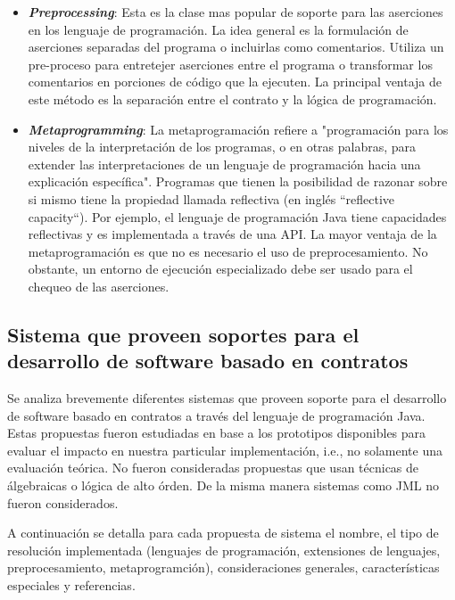{\begin{itemize}
\item \textbf{\textit{Preprocessing}}: Esta es la clase mas popular de soporte para las
aserciones en los lenguaje de programación. La idea general es la formulación
de aserciones separadas del programa o incluirlas como comentarios. Utiliza un
pre-proceso para entretejer aserciones entre el programa o transformar los
comentarios en porciones de código que la ejecuten. La principal ventaja de
este método es la separación entre el contrato y la lógica de programación.


\item \textbf{\textit{Metaprogramming}}: La metaprogramación refiere a 
"programación para los niveles de la interpretación de los
programas, o en otras palabras, para extender las interpretaciones de un
lenguaje de programación hacia una explicación específica"\cite{Temp1}.
Programas que tienen la posibilidad de razonar sobre si mismo tiene la
propiedad llamada reflectiva (en inglés ``reflective capacity``). Por ejemplo,
el lenguaje de programación Java tiene capacidades reflectivas y es
implementada a través de una API. La mayor ventaja de la metaprogramación es
que no es necesario el uso de preprocesamiento. No obstante, un entorno de
ejecución especializado debe ser usado para el chequeo de las aserciones.


\end{itemize}


\subsection{Sistema que proveen soportes para el desarrollo de software
basado en contratos} \label{sec:sistemasca}


Se analiza brevemente diferentes sistemas que proveen soporte para el
desarrollo de software basado en contratos a través del lenguaje de
programación Java. Estas propuestas fueron estudiadas en base a los prototipos disponibles para evaluar el impacto en nuestra particular implementación, i.e., no solamente una evaluación teórica. No fueron consideradas propuestas que usan técnicas de álgebraicas o lógica de alto órden. De la misma manera sistemas como JML \cite{Leavens99} no fueron considerados. 

A continuación se detalla para cada propuesta de sistema el nombre, el tipo de resolución implementada (lenguajes de programación, extensiones de
lenguajes, preprocesamiento, metaprogramción), consideraciones generales,
características especiales y referencias.

}
